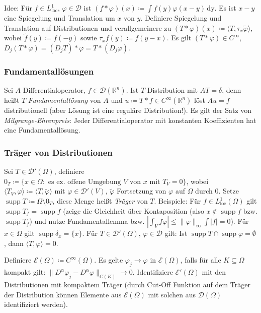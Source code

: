 \documentclass[11pt,a4paper]{scrartcl}
\newcommand{\R}{\mathbb{R}} %
\newcommand{\D}{\mathcal{D}}
\newcommand{\E}{\mathcal{E}}
\theoremstyle{plain}
\theoremstyle{definition}
\theoremstyle{remark}
\DeclareMathOperator{\supp}{supp}
\DeclareMathOperator{\loc}{loc}
\begin{document}
Idee: Für $f\in L^1_{\loc}$, $\varphi\in \D$ ist $(f*\varphi)(x)\coloneqq \int f(y)\varphi(x-y) \, \mathrm{dy}$. Es ist $x-y$ eine Spiegelung und Translation um $x$ von $y$. Definiere Spiegelung und Translation auf Distributionen und verallgemeinere zu $(T*\varphi)(x)\coloneqq \langle T, \tau_x \tilde\varphi \rangle$, wobei $\tilde f(y) \coloneqq f(-y)$ sowie $\tau_x f(y) \coloneqq f(y-x)$. Es gilt $(T*\varphi)\in C^\infty$, $D_j (T*\varphi) = (D_j T)*\varphi = T*(D_j \varphi)$.

\subsubsection{Fundamentallösungen}

Sei $A$ Differentialoperator, $f\in \D(\R^n)$. Ist $T$ Distribution mit $AT=\delta$, denn heißt $T$ \emph{Fundamentallösung} von $A$ und $u\coloneqq T*f \in C^\infty(\R^n)$ löst $Au=f$ distributionell (aber Lösung ist eine reguläre Distribution!). Es gilt der Satz von \emph{Milgrange-Ehrenpreis}: Jeder Differentialoperator mit konstanten Koeffizienten hat eine Fundamentallösung.

\subsubsection{Träger von Distributionen}

Sei $T\in \D'(\Omega)$, definiere $0_T\coloneqq \{ x\in\Omega: \text{ es ex. offene Umgebung } V \text{ von } x \text{ mit } T_V = 0 \}$, wobei $\langle T_V, \varphi \rangle \coloneqq \langle T, \tilde\varphi \rangle$ mit $\varphi\in \D'(V)$, $\tilde\varphi$ Fortsetzung von $\varphi$ auf $\Omega$ durch $0$. Setze $\supp T\coloneqq \Omega \setminus 0_T$, diese Menge heißt \emph{Träger} von $T$. Beispiele: Für $f\in L^1_{\loc}(\Omega)$ gilt $\supp T_f = \supp f$ (zeige die Gleichheit über Kontaposition (also $x\not \in \supp f$ bzw. $\supp T_f$) und nutze Fundamentallemma bzw. $|\int_V f\varphi|\leq \|\varphi\|_\infty \int |f| = 0$). Für $x\in\Omega$ gilt $\supp \delta_x = \{ x \}$. Für $T\in \D'(\Omega)$, $\varphi \in \D$ gilt: Ist $\supp T \cap \supp \varphi = \emptyset$, dann $\langle T, \varphi \rangle = 0$.

Definiere $\E(\Omega) \coloneqq C^\infty(\Omega)$. Es gelte $\varphi_j \to \varphi$ in $\E(\Omega)$, falls für alle $K\subseteq \Omega$ kompakt gilt: $\|D^\alpha \varphi_j - D^\alpha \varphi \|_{C(K)} \to 0$.  Identifiziere $\E'(\Omega)$ mit den Distributionen mit kompaktem Träger (durch Cut-Off Funktion auf dem Träger der Distribution können Elemente aus $\E(\Omega)$ mit solchen aus $\D(\Omega)$ identifiziert werden).
\end{document}
